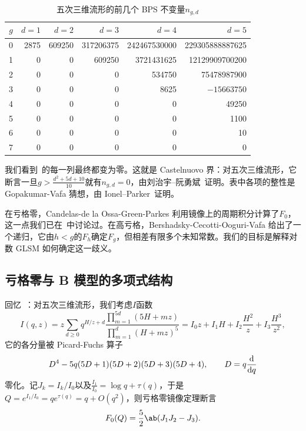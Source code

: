 \documentclass{amsart}
\theoremstyle{definition}
\theoremstyle{remark}
\theoremstyle{plain}
\theoremstyle{definition}
\theoremstyle{remark}
\newcommand{\1}{\mathbf{1}}
\newcommand{\2}{\mathbf{2}}
\newcommand{\3}{\mathbf{3}}
\begin{document}
\begin{table}[htpb]
    \centering
    \caption{五次三维流形的前几个 BPS 不变量\(n_{g,d}\)}
    \label{tab:quinticbps}
    \begin{tabular}{crrrrr}
        \toprule
        \(g\) & \(d=1\) & \(d=2\) & \(d=3\) & \(d=4\) & \(d=5\) \\
        \midrule
        0 & 2875 & 609250 & 317206375 & 242467530000 & 229305888887625 \\
        1 & 0 & 0 & 609250 & 3721431625 & 12129909700200 \\
        2 & 0 & 0 & 0 & 534750 & 75478987900 \\
        3 & 0 & 0 & 0 & 8625 & \(-15663750\) \\
        4 & 0 & 0 & 0 & 0 & 49250 \\
        5 & 0 & 0 & 0 & 0 & 1100 \\
        6 & 0 & 0 & 0 & 0 & 10 \\
        7 & 0 & 0 & 0 & 0 & 0 \\
        \bottomrule
    \end{tabular}
\end{table}

我们看到~的每一列最终都变为零。这就是 Castelnuovo 界：对五次三维流形，它断言一旦\(g > \frac{d^2+5d+10}{10}\)就有\(n_{g,d} = 0\)，由刘治宇--阮勇斌~\cite{LiuRuanCastelnuovo}证明。表中各项的整性是 Gopakumar-Vafa 猜想，由 Ionel--Parker~\cite{IonelParker2018}证明。

在亏格零，Candelas-de la Ossa-Green-Parkes 利用镜像上的周期积分计算了\(F_0\)，这一点我们已在~中讨论过。在高亏格，Bershadsky-Cecotti-Ooguri-Vafa 给出了一个递归，它由\(h < g\)的\(F_h\)确定\(F_g\)，但相差有限多个未知常数。我们的目标是解释对数 GLSM 如何确定这一歧义。

\subsection{亏格零与 B 模型的多项式结构}%
\label{sub:Genus zero and the polynomial structure of the B-model}

回忆~：对五次三维流形，我们考虑\(I\)函数
\[
    I(q,z) = z\sum_{d \geq 0} q^{H/z+d} \frac{\prod_{m=1}^{5d}(5H+mz)}{\prod_{m=1}^d (H+mz)^5} = I_0 z + I_1 H + I_2 \frac{H^2}{z} + I_3 \frac{H^3}{z^2},
\]
它的各分量被 Picard-Fuchs 算子
\[ D^4 - 5q(5D+1)(5D+2)(5D+3)(5D+4), \qquad D = q \odv{}{q} \]
零化。记\(J_k = I_k/I_0\)以及\(\frac{I_1}{I_0} = \log q + \tau(q)\)，于是\(Q = e^{I_1/I_0} = qe^{\tau(q)} = q + O(q^2)\)，则亏格零镜像定理断言
\[ F_0(Q) = \frac{5}{2}\ab(J_1 J_2 - J_3). \]
\end{document}
